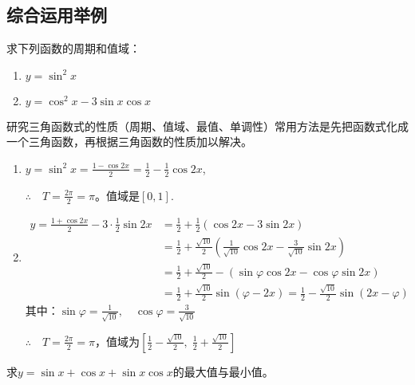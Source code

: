 \subsection{综合运用举例}

\begin{example}
    求下列函数的周期和值域：
\begin{multicols}{2}
\begin{enumerate}[(1)]
    \item $y=\sin^2x$
    \item $y=\cos^2x-3\sin x\cos x$
\end{enumerate}    
\end{multicols}
\end{example}

\begin{analyze}
    研究三角函数式的性质（周期、值域、最值、单调性）常用方法是先把函数式化成一个三角函数，再根据三角函数的性质加以解决。
\end{analyze}

\begin{solution}
\begin{enumerate}[(1)]
    \item  $y= \sin ^{2}x= \frac {1- \cos 2x}2= \frac 12- \frac 12\cos 2x$,

    $\therefore\quad T= \frac {2\pi }2= \pi$。值域是$[0,1]$.
    
    \item  \[\begin{split}
        y=\frac {1+ \cos 2x}2- 3\cdot \frac 12 \sin 2x &=\frac{1}{2}+\frac{1}{2}\left(\cos2x-3\sin2x\right)\\
    &=\frac{1}{2}+\frac{\sqrt{10}}{2}\left(\frac{1}{\sqrt{10}}\cos 2x-\frac{3}{\sqrt{10}}\sin 2x\right)
    \\
    &=\frac 12+ \frac {\sqrt {10}}2- ( \sin \varphi \cos 2x- \cos \varphi \sin 2x)\\
    &=\frac{1}{2}+\frac{\sqrt{10}}{2}\sin(\varphi-2x)=\frac{1}{2}-\frac{\sqrt{10}}{2}\sin(2x-\varphi)
    \end{split}\]
其中：$\sin\varphi=\frac{1}{\sqrt{10}},\quad \cos\varphi=\frac{3}{\sqrt{10}}$

$\therefore\quad T=\frac{2\pi}{2}=\pi$，值域为$\left[\frac{1}{2}-\frac{\sqrt{10}}{2},\; \frac{1}{2}+\frac{\sqrt{10}}{2}\right]$
\end{enumerate}
\end{solution}

\begin{example}
    求$y=\sin x+\cos x+\sin x\cos x$的最大值与最小值。
\end{example}

